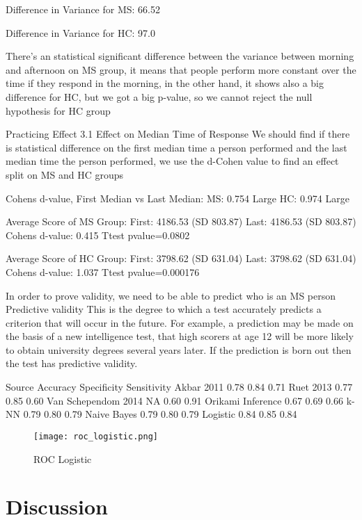 \documentclass[letterpaper, 10 pt, conference]{ieeeconf}
\begin{document}
Difference in Variance for MS: 66.52%

Difference in Variance for HC: 97.0%

There's an statistical significant difference between the variance between morning and afternoon on MS group, it means that people perform more constant over the time if they respond in the morning, in the other hand, it shows also a big difference for HC, but we got a big p-value, so we cannot reject the null hypothesis for HC group


Practicing Effect
3.1 Effect on Median Time of Response
We should find if there is statistical difference on the first median time a person performed and the last median time the person performed, we use the d-Cohen value to find an effect split on MS and HC groups

Cohens d-value, First Median vs Last Median: 
 MS: 0.754 Large 
 HC: 0.974 Large


Average Score of MS Group: 
 First: 4186.53 (SD 803.87) 
 Last: 4186.53 (SD 803.87) 
Cohens d-value: 0.415   Ttest pvalue=0.0802

Average Score of HC Group: 
 First: 3798.62 (SD 631.04) 
 Last: 3798.62 (SD 631.04) 
Cohens d-value: 1.037   Ttest pvalue=0.000176



In order to prove validity, we need to be able to predict who is an MS person
Predictive validity
This is the degree to which a test accurately predicts a criterion that will occur in the future. For example, a prediction may be made on the basis of a new intelligence test, that high scorers at age 12 will be more likely to obtain university degrees several years later. If the prediction is born out then the test has predictive validity.

Source	Accuracy	Specificity	Sensitivity
Akbar 2011	0.78	0.84	0.71
Ruet 2013	0.77	0.85	0.60
Van Schependom 2014	NA	0.60	0.91
Orikami
Inference	0.67	0.69	0.66
k-NN	0.79	0.80	0.79
Naive Bayes	0.79	0.80	0.79
Logistic	0.84	0.85	0.84

\begin{figure}[ht]
\texttt{[image: roc\_logistic.png]}
\caption{ROC Logistic}
\label{tab:roc}
\end{figure}


\section{Discussion}
\end{document}
